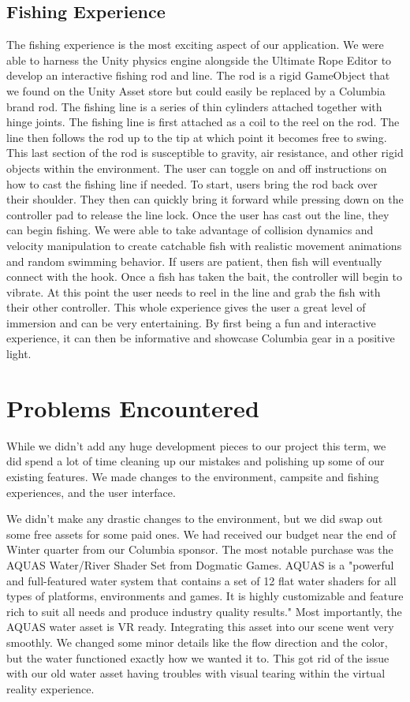 \documentclass[10pt,journal,compsoc,onecolumn, draftclsnofoot]{IEEEtran}
\begin{document}
\subsection{Fishing Experience}
The fishing experience is the most exciting aspect of our application. We were able to harness the Unity physics engine alongside the Ultimate Rope Editor to develop an interactive fishing rod and line. The rod is a rigid GameObject that we found on the Unity Asset store but could easily be replaced by a Columbia brand rod. The fishing line is a series of thin cylinders attached together with hinge joints. The fishing line is first attached as a coil to the reel on the rod. The line then follows the rod up to the tip at which point it becomes free to swing. This last section of the rod is susceptible to gravity, air resistance, and other rigid objects within the environment. The user can toggle on and off instructions on how to cast the fishing line if needed. To start, users bring the rod back over their shoulder. They then can quickly bring it forward while pressing down on the controller pad to release the line lock. Once the user has cast out the line, they can begin fishing. We were able to take advantage of collision dynamics and velocity manipulation to create catchable fish with realistic movement animations and random swimming behavior. If users are patient, then fish will eventually connect with the hook. Once a fish has taken the bait, the controller will begin to vibrate. At this point the user needs to reel in the line and grab the fish with their other controller. This whole experience gives the user a great level of immersion and can be very entertaining. By first being a fun and interactive experience, it can then be informative and showcase Columbia gear in a positive light.

\section{Problems Encountered}
While we didn't add any huge development pieces to our project this term, we did spend a lot of time cleaning up our mistakes and polishing up some of our existing features.
We made changes to the environment, campsite and fishing experiences, and the user interface.

We didn't make any drastic changes to the environment, but we did swap out some free assets for some paid ones.
We had received our budget near the end of Winter quarter from our Columbia sponsor.
The most notable purchase was the AQUAS Water/River Shader Set from Dogmatic Games.
AQUAS is a "powerful and full-featured water system that contains a set of 12 flat water shaders for all types of platforms, environments and games.
It is highly customizable and feature rich to suit all needs and produce industry quality results."
Most importantly, the AQUAS water asset is VR ready.
Integrating this asset into our scene went very smoothly.
We changed some minor details like the flow direction and the color, but the water functioned exactly how we wanted it to.
This got rid of the issue with our old water asset having troubles with visual tearing within the virtual reality experience.
\end{document}
